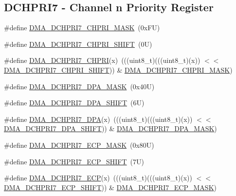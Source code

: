 \subsection*{D\+C\+H\+P\+R\+I7 -\/ Channel n Priority Register}
\begin{DoxyCompactItemize}
\item 
\#define \mbox{\hyperlink{group___d_m_a___register___masks_ga105d024654066128f4e62f32f8ca830d}{D\+M\+A\+\_\+\+D\+C\+H\+P\+R\+I7\+\_\+\+C\+H\+P\+R\+I\+\_\+\+M\+A\+SK}}~(0x\+F\+U)
\item 
\#define \mbox{\hyperlink{group___d_m_a___register___masks_ga0ae4f29819a1dfb16bbffee2db4d558e}{D\+M\+A\+\_\+\+D\+C\+H\+P\+R\+I7\+\_\+\+C\+H\+P\+R\+I\+\_\+\+S\+H\+I\+FT}}~(0\+U)
\item 
\#define \mbox{\hyperlink{group___d_m_a___register___masks_gae06b4c8f0c37e7dc457e9a43673cbe4e}{D\+M\+A\+\_\+\+D\+C\+H\+P\+R\+I7\+\_\+\+C\+H\+P\+RI}}(x)~(((uint8\+\_\+t)(((uint8\+\_\+t)(x)) $<$$<$ \mbox{\hyperlink{group___d_m_a___register___masks_ga0ae4f29819a1dfb16bbffee2db4d558e}{D\+M\+A\+\_\+\+D\+C\+H\+P\+R\+I7\+\_\+\+C\+H\+P\+R\+I\+\_\+\+S\+H\+I\+FT}})) \& \mbox{\hyperlink{group___d_m_a___register___masks_ga105d024654066128f4e62f32f8ca830d}{D\+M\+A\+\_\+\+D\+C\+H\+P\+R\+I7\+\_\+\+C\+H\+P\+R\+I\+\_\+\+M\+A\+SK}})
\item 
\#define \mbox{\hyperlink{group___d_m_a___register___masks_gab10ff916f8dfc06df312689bd2dd36f5}{D\+M\+A\+\_\+\+D\+C\+H\+P\+R\+I7\+\_\+\+D\+P\+A\+\_\+\+M\+A\+SK}}~(0x40\+U)
\item 
\#define \mbox{\hyperlink{group___d_m_a___register___masks_ga531216c2edb80108b8c4cd13883aef06}{D\+M\+A\+\_\+\+D\+C\+H\+P\+R\+I7\+\_\+\+D\+P\+A\+\_\+\+S\+H\+I\+FT}}~(6\+U)
\item 
\#define \mbox{\hyperlink{group___d_m_a___register___masks_ga4fcecaadbddf8da68c130b483adf4243}{D\+M\+A\+\_\+\+D\+C\+H\+P\+R\+I7\+\_\+\+D\+PA}}(x)~(((uint8\+\_\+t)(((uint8\+\_\+t)(x)) $<$$<$ \mbox{\hyperlink{group___d_m_a___register___masks_ga531216c2edb80108b8c4cd13883aef06}{D\+M\+A\+\_\+\+D\+C\+H\+P\+R\+I7\+\_\+\+D\+P\+A\+\_\+\+S\+H\+I\+FT}})) \& \mbox{\hyperlink{group___d_m_a___register___masks_gab10ff916f8dfc06df312689bd2dd36f5}{D\+M\+A\+\_\+\+D\+C\+H\+P\+R\+I7\+\_\+\+D\+P\+A\+\_\+\+M\+A\+SK}})
\item 
\#define \mbox{\hyperlink{group___d_m_a___register___masks_ga544768122b9d6cea0945411c14c5f79f}{D\+M\+A\+\_\+\+D\+C\+H\+P\+R\+I7\+\_\+\+E\+C\+P\+\_\+\+M\+A\+SK}}~(0x80\+U)
\item 
\#define \mbox{\hyperlink{group___d_m_a___register___masks_gad2c636360eb68d654d17b99db5d849d6}{D\+M\+A\+\_\+\+D\+C\+H\+P\+R\+I7\+\_\+\+E\+C\+P\+\_\+\+S\+H\+I\+FT}}~(7\+U)
\item 
\#define \mbox{\hyperlink{group___d_m_a___register___masks_gae12d948360b30e44009387391625fe88}{D\+M\+A\+\_\+\+D\+C\+H\+P\+R\+I7\+\_\+\+E\+CP}}(x)~(((uint8\+\_\+t)(((uint8\+\_\+t)(x)) $<$$<$ \mbox{\hyperlink{group___d_m_a___register___masks_gad2c636360eb68d654d17b99db5d849d6}{D\+M\+A\+\_\+\+D\+C\+H\+P\+R\+I7\+\_\+\+E\+C\+P\+\_\+\+S\+H\+I\+FT}})) \& \mbox{\hyperlink{group___d_m_a___register___masks_ga544768122b9d6cea0945411c14c5f79f}{D\+M\+A\+\_\+\+D\+C\+H\+P\+R\+I7\+\_\+\+E\+C\+P\+\_\+\+M\+A\+SK}})
\end{DoxyCompactItemize}
